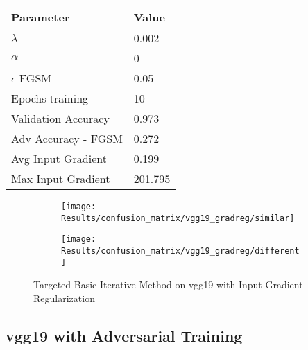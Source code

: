 \documentclass[draft,final]{vutinfth} %
\begin{document}
\begin{table}[h]
  \centering
  \begin{tabular}{ll}
    \toprule
			Parameter			& Value   \\
    \midrule
			$\lambda$								& 0.002				\\
			$\alpha$								& 0				\\
			$\epsilon$ FGSM					& 0.05		\\
			Epochs training					& 10			\\
			
			Validation Accuracy			& 0.973		\\ 
			Adv Accuracy - FGSM			& 0.272		\\
			
			Avg Input Gradient			& 0.199		\\
			Max Input Gradient			& 201.795	\\
    \bottomrule
  \end{tabular}
\end{table}


\begin{figure}[h]
  \begin{subfigure}[b]{0.5\columnwidth}
		\centering
    \texttt{[image: Results/confusion\_matrix/vgg19\_gradreg/similar]}
    \label{fig:exp:cm:vgg19_gradreg:similar}
  \end{subfigure}
  \begin{subfigure}[b]{0.5\columnwidth}
		\centering
    \texttt{[image: Results/confusion\_matrix/vgg19\_gradreg/different]}
    \label{fig:exp:cm:vgg19_gradreg:different}
  \end{subfigure}
  \caption{Targeted Basic Iterative Method on vgg19 with Input Gradient Regularization}
  \label{fig:exp:cm:vgg19_gradreg}
\end{figure}
\clearpage

\subsection{vgg19 with Adversarial Training}
\end{document}

